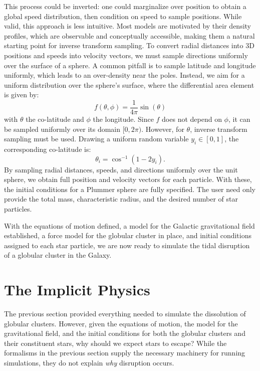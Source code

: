             This process could be inverted: one could marginalize over position to obtain a global speed distribution, then condition on speed to sample positions. While valid, this approach is less intuitive. Most models are motivated by their density profiles, which are observable and conceptually accessible, making them a natural starting point for inverse transform sampling.
            To convert radial distances into 3D positions and speeds into velocity vectors, we must sample directions uniformly over the surface of a sphere. A common pitfall is to sample latitude and longitude uniformly, which leads to an over-density near the poles. Instead, we aim for a uniform distribution over the sphere's surface, where the differential area element is given by:
            \begin{equation}
                f(\theta,\phi)=\frac{1}{4\pi}\sin(\theta)
            \end{equation} 
            with $\theta$ the co-latitude and $\phi$ the longitude. Since $f$ does not depend on $\phi$, it can be sampled uniformly over its domain $[0, 2\pi)$. However, for $\theta$, inverse transform sampling must be used. Drawing a uniform random variable $y_i \in [0,1]$, the corresponding co-latitude is:
            \begin{equation}
                \theta_i = \cos^{-1}\left(1-2y_i\right).
            \end{equation}
            By sampling radial distances, speeds, and directions uniformly over the unit sphere, we obtain full position and velocity vectors for each particle. With these, the initial conditions for a Plummer sphere are fully specified. The user need only provide the total mass, characteristic radius, and the desired number of star particles.

            With the equations of motion defined, a model for the Galactic gravitational field established, a force model for the globular cluster in place, and initial conditions assigned to each star particle, we are now ready to simulate the tidal disruption of a globular cluster in the Galaxy.

\section{The Implicit Physics}
    The previous section provided everything needed to simulate the dissolution of globular clusters. However, given the equations of motion, the model for the gravitational field, and the initial conditions for both the globular clusters and their constituent stars, why should we expect stars to escape? While the formalisms in the previous section supply the necessary machinery for running simulations, they do not explain \textit{why} disruption occurs.

